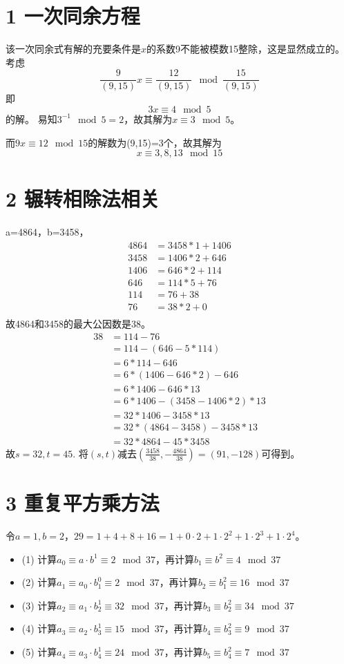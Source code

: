 \documentclass{article}
\date{\today}
\begin{document}
\section*{1 一次同余方程}
该一次同余式有解的充要条件是$x$的系数9不能被模数15整除，这是显然成立的。考虑$$\frac{9}{(9,15)}x\equiv\frac{12}{(9,15)} \mod \frac{15}{(9,15)}$$
即\[3x\equiv4 \mod 5\]的解。
易知$3^{-1}\mod 5 = 2$，故其解为$x\equiv 3 \mod 5$。

而$9x\equiv 12 \mod 15$的解数为(9,15)=3个，故其解为
\[x\equiv 3,8,13 \mod 15\]
\section*{2 辗转相除法相关}
a=4864，b=3458，
$$
\begin{aligned}
4864 &= 3458*1 + 1406\\
3458 &= 1406*2 + 646\\
1406 &= 646 *2 + 114\\
646 &= 114 * 5 + 76\\
114 &= 76 + 38\\
76 &= 38*2 + 0\\
\end{aligned}
$$
故4864和3458的最大公因数是38。
$$
\begin{aligned}
38 &= 114 - 76\\
&=114 - (646-5*114)\\
&=6*114 - 646\\
&=6*(1406-646*2) - 646\\
&=6*1406 - 646*13\\
&=6*1406 - (3458-1406*2)*13\\
&=32*1406 - 3458*13\\
&=32*(4864-3458) - 3458*13\\
&=32*4864 - 45*3458
\end{aligned}
$$
故$s=32,t=45$.
将$(s,t)$减去$(\frac{3458}{38},-\frac{4864}{38})=(91,-128)$可得到$	$。
\section*{3 重复平方乘方法}
令$a=1,b=2$，$29=1+4+8+16=1+0\cdot2+1\cdot2^2+1\cdot2^3+1\cdot2^4$。
\begin{itemize}
\item[] (1)
计算$a_0\equiv a\cdot b^1 \equiv2 \mod 37$，再计算$b_1\equiv b^2\equiv 4 \mod 37$
\item[] (2)
计算$a_1\equiv a_0\cdot b_1^0 \equiv2 \mod 37$，再计算$b_2\equiv b_1^2\equiv 16 \mod 37$
\item[] (3)
计算$a_2\equiv a_1\cdot b_2^1 \equiv32 \mod 37$，再计算$b_3\equiv b_2^2\equiv 34 \mod 37$
\item[] (4)
计算$a_3\equiv a_2\cdot b_3^1 \equiv15 \mod 37$，再计算$b_4\equiv b_3^2\equiv 9 \mod 37$
\item[] (5)
计算$a_4\equiv a_3\cdot b_4^1 \equiv24 \mod 37$，再计算$b_5\equiv b_4^2\equiv 7 \mod 37$
\end{itemize}
\end{document}
